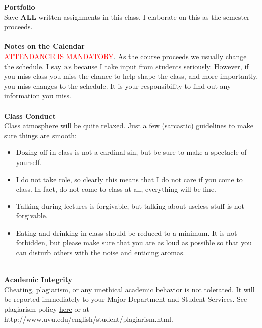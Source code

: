 \documentclass [11pt]{article}
\begin{document}
 {\bf Portfolio}\\
   Save {\bf ALL} written assignments in this class. I elaborate on this as the semester proceeds. \\
   \ \\ 

   {\bf Notes on the Calendar}\\
   \textcolor{red}{ATTENDANCE IS MANDATORY}. As the course proceeds we usually change the schedule. I say {\it we} because I take input from students seriously. However, if you miss class you miss the chance to help shape the class, and more importantly, you miss changes to the schedule. It is your responsibility to find out any information you miss. \\
   \ \\  

   {\bf Class Conduct}\\
   Class atmosphere will be quite relaxed. Just a few (sarcastic) guidelines to make sure things are smooth:
   \begin{itemize}
   \item  Dozing off in class is not a cardinal sin, but be sure to make a spectacle of yourself.
   \item I do not take role, so clearly this means that I do not care if you come to class. In fact, do not come to class at all, everything will be fine.
    \item Talking during lectures is forgivable, but talking about useless stuff is not forgivable.
     \item  Eating and drinking in class should be reduced to a minimum. It is not forbidden, but please make sure that you are as loud as possible so that you can disturb others with the noise and enticing aromas.
        
    \end{itemize}
   \ \\
       

   {\bf Academic Integrity}\\
 Cheating, plagiarism, or any unethical academic behavior is not tolerated. It will be reported immediately to your Major Department and Student Services. See plagiarism policy \href{http://www.uvu.edu/english/student/plagiarism.html}{here} or at http://www.uvu.edu/english/student/plagiarism.html.\\
   \ \\
  
\end{document}
